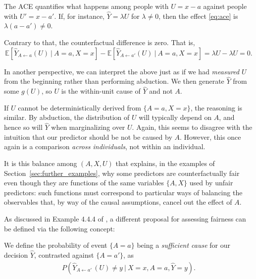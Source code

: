 The ACE quantifies what happens among people with $U = x -
a$ against people with $U' = x - a'$. If, for instance, $\hat Y =
\lambda U$ for $\lambda \neq 0$, then the effect \eqref{eq:ace}
is $\lambda(a - a') \neq 0$.

Contrary to that, the counterfactual difference is zero.
That is,
\[
\mathbb{E}[\hat Y_{A \leftarrow a}(U)\ |\ A = a, X = x] -
\mathbb{E}[\hat Y_{A \leftarrow a'}(U)\ |\ A = a, X = x] =
\lambda U - \lambda U = 0.
\]

In another perspective, we can interpret the above just as if we had
{\it measured} $U$ from the beginning rather than performing
abduction. We then generate $\hat Y$ from some $g(U)$, so $U$ is the
within-unit cause of $\hat Y$ and not $A$.

If $U$ cannot be deterministically derived from $\{A = a, X = x\}$,
the reasoning is similar. By abduction, the distribution of $U$ will
typically depend on $A$, and hence so will $\hat Y$ when marginalizing
over $U$. Again, this seems to disagree with the intuition that our
predictor should be not be caused by $A$. However, this once again is
a comparison {\it across individuals}, not within an individual. 

It is this balance among $(A, X, U)$ that explains, in the examples
of Section~\ref{sec:further_examples}, why some predictors are
counterfactually fair even though they are functions of the same
variables $\{A, X\}$ used by unfair predictors: such functions must
correspond to particular ways of balancing the observables that, by
way of the causal assumptions, cancel out the effect of $A$.

 As discussed in
Example 4.4.4 of \citet{pearl:16}, a different proposal for
assessing fairness can be defined via the following concept:
\begin{define}
  We define the probability of event $\{ A = a \}$ being a
  \emph{sufficient cause} for our
  decision $\hat Y$, contrasted against $\{ A = a' \}$, as
\begin{align}
  P(\hat Y_{A \leftarrow a'\ }(U) \neq y\ |\ X = x, A = a, \hat Y = y).
\end{align}
\end{define}

